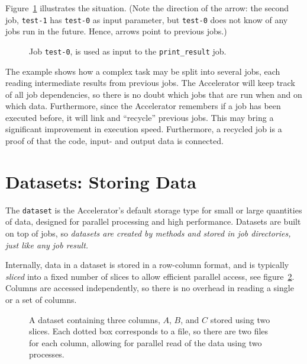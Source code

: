 Figure~\ref{fig:execflow-print-result} illustrates the situation.
(Note the direction of the arrow: the second job, \texttt{test-1} has
\texttt{test-0} as input parameter, but \texttt{test-0} does not know
of any jobs run in the future.  Hence, arrows point to previous jobs.)

\begin{figure}[h!]
  \begin{center}
    
    \caption{Job \texttt{test-0}, is used as input to the
      \texttt{print\_result} job.}
    \label{fig:execflow-print-result}
  \end{center}
\end{figure}

The example shows how a complex task may be split into several jobs,
each reading intermediate results from previous jobs.  The Accelerator
will keep track of all job dependencies, so there is no doubt which
jobs that are run when and on which data.  Furthermore, since the
Accelerator remembers if a job has been executed before, it will link
and ``recycle'' previous jobs.  This may bring a significant
improvement in execution speed.  Furthermore, a recycled job is a
proof of that the code, input- and output data is connected.


\section{Datasets: Storing Data}

The \texttt{dataset} is the Accelerator's default storage type for
small or large quantities of data, designed for parallel processing
and high performance.  Datasets are built on top of jobs, so
\emph{datasets are created by methods and stored in job directories,
  just like any job result.}

Internally, data in a dataset is stored in a row-column format, and is
typically \emph{sliced} into a fixed number of slices to allow
efficient parallel access, see figure~\ref{fig:dataset}. Columns are
accessed independently, so there is no overhead in reading a single or
a set of columns.


\begin{figure}[h!]
  \begin{center}
    
    \caption{A dataset containing three columns, $A$, $B$, and $C$
      stored using two slices.  Each dotted box corresponds to a file,
      so there are two files for each column, allowing for parallel
      read of the data using two processes.}
    \label{fig:dataset}
  \end{center}
\end{figure}

